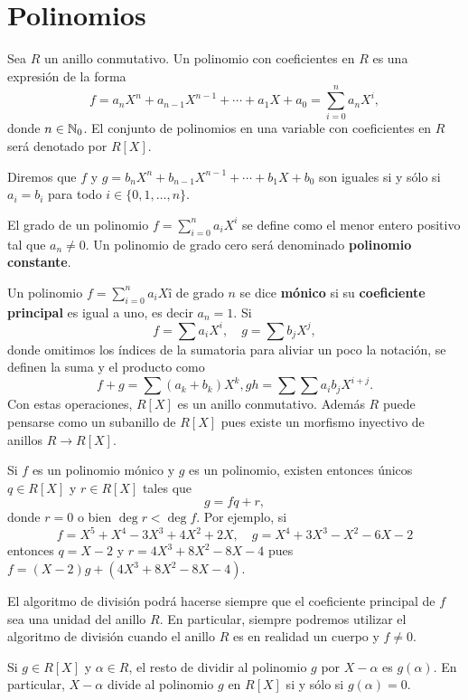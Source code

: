 \chapter{Polinomios}

Sea $R$ un anillo conmutativo. 
Un polinomio con coeficientes en $R$ es una expresión
de la forma
\[
	f=a_nX^n+a_{n-1}X^{n-1}+\cdots+a_1X+a_0=\sum_{i=0}^n a_nX^i,
\]
donde $n\in\mathbb{N}_0$. El conjunto de polinomios en una variable 
con coeficientes en $R$ será denotado por $R[X]$. 

Diremos que $f$ y $g=b_nX^n+b_{n-1}X^{n-1}+\cdots+b_1X+b_0$ son iguales si y
sólo si $ a_i=b_i$ para todo $i\in\{0,1,\dots,n\}$. 

El grado de un polinomio $f=\sum_{i=0}^na_iX^i$ se define como el menor entero positivo tal que $a_n\ne0$. Un polinomio de grado cero
será denominado \textbf{polinomio constante}.

Un polinomio $f=\sum_{i=0}^na_iXî$ de grado $n$ se dice \textbf{mónico} si su \textbf{coeficiente principal} es igual a uno, es decir $a_n=1$.   
Si 
\[
f=\sum a_iX^i,\quad
g=\sum b_jX^j,
\]
donde omitimos los índices de la sumatoria para aliviar un poco la notación, se definen la
suma y el producto como
\[
f+g=\sum (a_k+b_k)X^k,
gh=\sum\sum a_ib_jX^{i+j}.
\]
Con estas operaciones, $R[X]$ es un anillo conmutativo. Además $R$ puede pensarse como un subanillo de $R[X]$ pues
existe un morfismo inyectivo de anillos $R\to R[X]$.  

\begin{example}
Si $f$ es un polinomio mónico y $g$ es un polinomio, existen entonces únicos $q\in R[X]$ y $r\in R[X]$ tales que
\[
g=fq+r,
\]
donde $r=0$ o bien $\deg r<\deg f$. Por ejemplo, si
\[
f=X^5+X^4-3X^3+4X^2+2X,\quad
g=X^4+3X^3-X^2-6X-2
\]
entonces $q=X-2$ y $r=4X^3+8X^2-8X-4$ pues $f=(X-2)g+(4X^3+8X^2-8X-4)$. 
\end{example}

El algoritmo de división podrá hacerse siempre que el coeficiente principal de $f$ sea una unidad del anillo $R$. En particular, siempre podremos
utilizar el algoritmo de división cuando el anillo $R$ es en realidad un cuerpo y $f\ne 0$.  

\begin{proposition}
Si $g\in R[X]$ y $\alpha\in R$, el resto de dividir al polinomio $g$ por $X-\alpha$ es $g(\alpha)$. En particular, $X-\alpha$ divide al polinomio  
$g$ en $R[X]$ si y sólo si $g(\alpha)=0$. 
\end{proposition}

